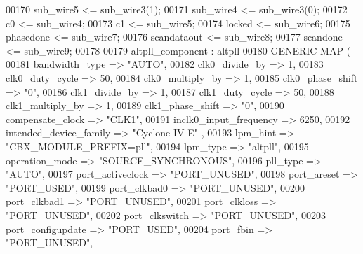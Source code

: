 \begin{DoxyCode}
{00170     \textcolor{vhdlchar}{sub_wire5}    \textcolor{vhdlchar}{<=} \textcolor{vhdlchar}{sub_wire3}\textcolor{vhdlchar}{(}\textcolor{vhdllogic}{}\textcolor{vhdllogic}{1}\textcolor{vhdlchar}{)};
00171     \textcolor{vhdlchar}{sub_wire4}    \textcolor{vhdlchar}{<=} \textcolor{vhdlchar}{sub_wire3}\textcolor{vhdlchar}{(}\textcolor{vhdllogic}{}\textcolor{vhdllogic}{0}\textcolor{vhdlchar}{)};
00172     \textcolor{vhdlchar}{c0}    \textcolor{vhdlchar}{<=} \textcolor{vhdlchar}{sub_wire4};
00173     \textcolor{vhdlchar}{c1}    \textcolor{vhdlchar}{<=} \textcolor{vhdlchar}{sub_wire5};
00174     locked    <= sub\_wire6;
00175     \textcolor{vhdlchar}{phasedone}    \textcolor{vhdlchar}{<=} \textcolor{vhdlchar}{sub_wire7};
00176     \textcolor{vhdlchar}{scandataout}    \textcolor{vhdlchar}{<=} \textcolor{vhdlchar}{sub_wire8};
00177     \textcolor{vhdlchar}{scandone}    \textcolor{vhdlchar}{<=} \textcolor{vhdlchar}{sub_wire9};
00178 
00179     altpll_component : altpll
00180     \textcolor{keywordflow}{GENERIC} \textcolor{keywordflow}{MAP} (
00181         bandwidth\_type => \textcolor{keyword}{"AUTO"},
00182         clk0\_divide\_by => \textcolor{vhdllogic}{1},
00183         clk0\_duty\_cycle => \textcolor{vhdllogic}{50},
00184         clk0\_multiply\_by => \textcolor{vhdllogic}{1},
00185         clk0\_phase\_shift => "\textcolor{vhdllogic}{0}",
00186         clk1\_divide\_by => \textcolor{vhdllogic}{1},
00187         clk1\_duty\_cycle => \textcolor{vhdllogic}{50},
00188         clk1\_multiply\_by => \textcolor{vhdllogic}{1},
00189         clk1\_phase\_shift => "\textcolor{vhdllogic}{0}",
00190         compensate\_clock => \textcolor{keyword}{"CLK1"},
00191         inclk0\_input\_frequency => \textcolor{vhdllogic}{6250},
00192         intended\_device\_family => \textcolor{keyword}{"Cyclone IV E"}  ,
00193         lpm\_hint => \textcolor{keyword}{"CBX\_MODULE\_PREFIX=pll"},
00194         lpm\_type => \textcolor{keyword}{"altpll"},
00195         operation\_mode => \textcolor{keyword}{"SOURCE\_SYNCHRONOUS"},
00196         pll\_type => \textcolor{keyword}{"AUTO"},
00197         port\_activeclock => \textcolor{keyword}{"PORT\_UNUSED"},
00198         port\_areset => \textcolor{keyword}{"PORT\_USED"},
00199         port\_clkbad0 => \textcolor{keyword}{"PORT\_UNUSED"},
00200         port\_clkbad1 => \textcolor{keyword}{"PORT\_UNUSED"},
00201         port\_clkloss => \textcolor{keyword}{"PORT\_UNUSED"},
00202         port\_clkswitch => \textcolor{keyword}{"PORT\_UNUSED"},
00203         port\_configupdate => \textcolor{keyword}{"PORT\_USED"},
00204         port\_fbin => \textcolor{keyword}{"PORT\_UNUSED"},
}
\end{DoxyCode}

